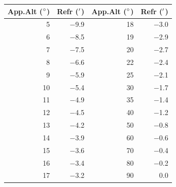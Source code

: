 \begin{tabular}{r r || r r}
\toprule
\textbf{App.Alt (${}^{\circ}$)} & \textbf{Refr (${}^{\prime}$)} & \textbf{App.Alt (${}^{\circ}$)} & \textbf{Refr (${}^{\prime}$)}\\
\midrule
5 & $-$9.9 & 18 & $-$3.0 \\
6 & $-$8.5 & 19 & $-$2.9 \\
7 & $-$7.5 & 20 & $-$2.7 \\
8 & $-$6.6 & 22 & $-$2.4 \\
9 & $-$5.9 & 25 & $-$2.1 \\
10 & $-$5.4 & 30 & $-$1.7 \\
11 & $-$4.9 & 35 & $-$1.4 \\
12 & $-$4.5 & 40 & $-$1.2 \\
13 & $-$4.2 & 50 & $-$0.8 \\
14 & $-$3.9 & 60 & $-$0.6 \\
15 & $-$3.6 & 70 & $-$0.4 \\
16 & $-$3.4 & 80 & $-$0.2 \\
17 & $-$3.2 & 90 & 0.0 \\
\bottomrule
\end{tabular}
